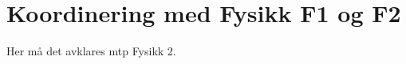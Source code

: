 \section{Koordinering med Fysikk F1 og F2} \label{Sec: KoordF1F2}

    Her må det avklares mtp Fysikk 2.
